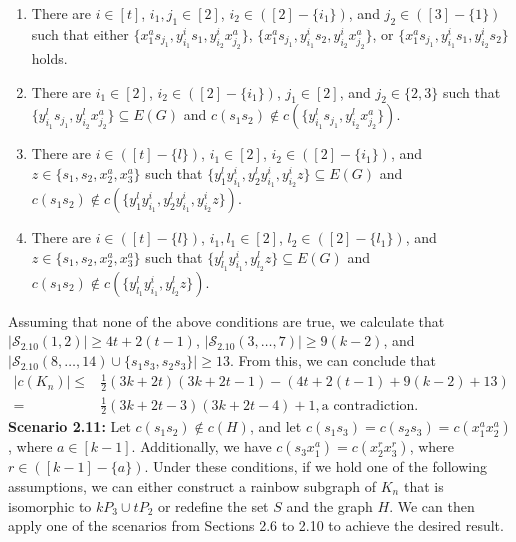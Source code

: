 \documentclass[12pt]{article}
\begin{document}
\begin{enumerate}
  \item There are $i\in[t]$, $i_1,j_1\in[2]$, $i_2\in([2]-\{i_1\})$, and $j_2\in([3]-\{1\})$ such that either $\{x^a_1s_{j_1},y^i_{i_1}s_{1},y^i_{i_2}x^a_{j_2}\}$, $\{x^a_1s_{j_1},y^i_{i_1}s_{2},y^i_{i_2}x^a_{j_2}\}$, or $\{x^a_1s_{j_1},y^i_{i_1}s_{1},y^i_{i_2}s_2\}$ holds.
   \item There are $i_1\in[2]$, $i_2\in([2]-\{i_1\})$, $j_1\in[2]$, and $j_2\in\{2,3\}$ such that $\{y^l_{i_1}s_{j_1},y^l_{i_2}x^a_{j_2}\}\subseteq E(G)$ and $c(s_1s_2)\not\in c(\{y^l_{i_1}s_{j_1},y^l_{i_2}x^a_{j_2}\})$.
    \item There are $i\in([t]-\{l\})$, $i_1\in[2]$, $i_2\in([2]-\{i_1\})$, and $z\in\{s_1,s_2,x^a_2,x^a_3\}$ such that $\{y^l_1y^i_{i_1},y^l_2y^i_{i_1},y^i_{i_2}z\}\subseteq E(G)$ and $c(s_1s_2)\not\in c(\{y^l_1y^i_{i_1},y^l_2y^i_{i_1},y^i_{i_2}z\})$.
    \item There are $i\in([t]-\{l\})$, $i_1,l_1\in[2]$, $l_2\in([2]-\{l_1\})$, and $z\in\{s_1,s_2,x^a_2,x^a_3\}$ such that $\{y^l_{l_1}y^i_{i_1},y^l_{l_2}z\}\subseteq E(G)$ and $c(s_1s_2)\not\in c(\{y^l_{l_1}y^i_{i_1},y^l_{l_2}z\})$.
 \end{enumerate}
Assuming that none of the above conditions are true, we calculate that \( |\mathcal{S}_{2.10}(1,2)| \geq 4t + 2(t - 1) \), \( |\mathcal{S}_{2.10}(3,\ldots,7)| \geq 9(k - 2) \), and \( |\mathcal{S}_{2.10}(8,\ldots,14) \cup \{s_1s_3, s_2s_3\}| \geq 13 \). From this, we can conclude that
  \begin{align*}
  |c(K_n)|\leq & \frac{1}{2}(3k+2t)(3k+2t-1)-(4t+2(t-1)+9(k-2)+13)\\
  = &\frac{1}{2}(3k+2t-3)(3k+2t-4)+1, \text{a contradiction}.
\end{align*}
 {\bf Scenario 2.11:} Let \(c(s_1s_2) \notin c(H)\), and let \(c(s_1s_3) = c(s_2s_3) = c(x^a_1x^a_2)\), where \(a \in [k-1]\). Additionally, we have \(c(s_3x^a_1) = c(x^r_2x^r_3)\), where \(r \in ([k-1] - \{a\})\).
Under these conditions, if we hold one of the following assumptions, we can either construct a rainbow subgraph of \(K_n\) that is isomorphic to \(kP_3 \cup tP_2\) or redefine the set \(S\) and the graph \(H\). We can then apply one of the scenarios from Sections 2.6 to 2.10 to achieve the desired result.
\end{document}
